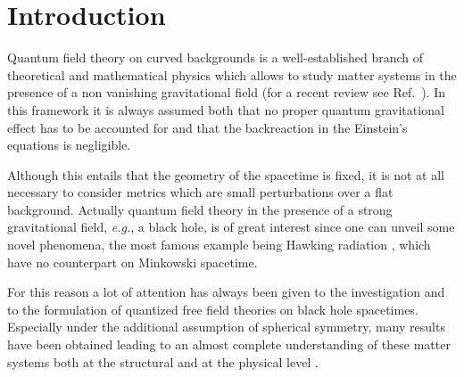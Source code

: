 \documentclass[aps, prd, amsmath, floats, floatfix, twocolumn, nofootinbib, superscriptaddress, showpacs]{revtex4-1}
\begin{document}
\maketitle




\section{Introduction}

Quantum field theory on curved backgrounds is a well-established branch
of theoretical and mathematical physics which allows to study matter
systems in the presence of a non vanishing gravitational field (for a
recent review see Ref.~\cite{Benini:2013fia}). In this framework it is
always assumed both that no proper quantum gravitational effect has to
be accounted for and that the backreaction in the Einstein's equations
is negligible. 

Although this entails that the geometry of the spacetime is fixed, it is
not at all necessary to consider metrics which are small perturbations
over a flat background. Actually quantum field theory in the presence of
a strong gravitational field, {\it e.g.}, a black hole, is of great
interest since one can unveil some novel phenomena, the most famous
example being Hawking radiation \cite{Hawking:1974sw}, which have no
counterpart on Minkowski spacetime. 

For this reason a lot of attention has always been given to the
investigation and to the formulation of quantized free field theories on
black hole spacetimes. Especially under the additional assumption of
spherical symmetry, many results have been obtained leading to an almost
complete understanding of these matter systems both at the structural
and at the physical level
\cite{Christensen:1976vb,Candelas:1980zt,Howard:1984qp,Fredenhagen:1989kr,
Anderson:1990jh,Anderson:1993if,Anderson:1993if,Anderson:1994hg}.
\end{document}
